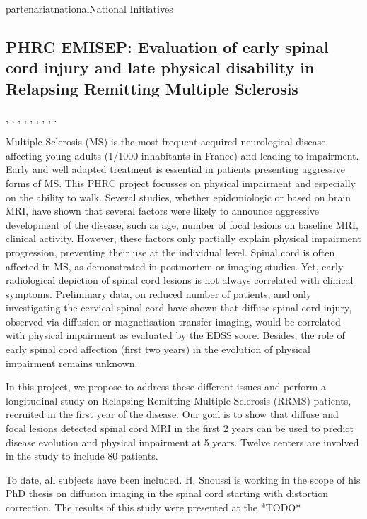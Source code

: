\documentclass{ra2018}
\begin{document}
\begin{module}{partenariat}{national}{National Initiatives}
  \subsection{PHRC EMISEP: Evaluation of early spinal cord injury and late
	physical disability in Relapsing Remitting Multiple Sclerosis}
\begin{participants}
	, 
	,
	,
	,
	, 
	, 
	,
	,
	.
\end{participants}
Multiple Sclerosis (MS) is the most frequent acquired neurological disease
affecting young adults (1/1000 inhabitants in France)  and leading to
impairment.  Early and well adapted treatment is essential in patients
presenting aggressive forms of MS. This PHRC project focusses on physical
impairment and especially on the ability to walk. Several studies, whether
epidemiologic or based on brain MRI, have shown that several factors were likely
to announce aggressive development of the disease, such as age, number of focal
lesions on baseline MRI, clinical activity. However, these factors only
partially explain physical impairment progression, preventing their use at the
individual level. Spinal cord is often affected in MS, as demonstrated in
postmortem or imaging studies.  Yet, early radiological depiction of spinal
cord lesions is not always correlated with clinical symptoms. Preliminary data,
on reduced number of patients, and only investigating the cervical spinal cord
have shown that diffuse spinal cord injury, observed via diffusion or
magnetisation transfer imaging, would be correlated with physical impairment as
evaluated by the EDSS score. Besides, the role of early spinal cord affection
(first two years) in the evolution of physical impairment remains unknown.

In this project, we propose to address these different issues and perform a
longitudinal study on Relapsing Remitting Multiple Sclerosis (RRMS) patients,
recruited in the first year of the disease. Our goal is to show that diffuse
and focal lesions detected spinal cord MRI in the first 2 years can be used to
predict disease evolution and physical impairment at 5 years. Twelve centers
are involved in the study to include 80 patients. 

To date, all subjects have been included. H. Snoussi is working in the
scope of his PhD thesis on diffusion imaging in the spinal cord starting with distortion correction. The results of this study were presented at the *TODO*


\end{module}
\end{document}
